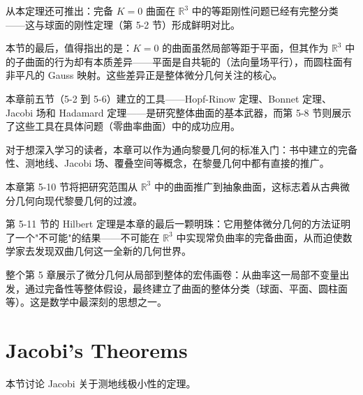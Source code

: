 \begin{Remark}
\begin{Remark}
从本定理还可推出：完备 $K=0$ 曲面在 $\mathbb{R}^3$ 中的等距刚性问题已经有完整分类——这与球面的刚性定理（第 5-2 节）形成鲜明对比。
\end{Remark}

\begin{Remark}
本节的最后，值得指出的是：$K=0$ 的曲面虽然局部等距于平面，但其作为 $\mathbb{R}^3$ 中的子曲面的行为却有本质差异——平面是自共轭的（法向量场平行），而圆柱面有非平凡的 Gauss 映射。这些差异正是整体微分几何关注的核心。
\end{Remark}

\begin{Remark}
本章前五节（5-2 到 5-6）建立的工具——Hopf-Rinow 定理、Bonnet 定理、Jacobi 场和 Hadamard 定理——是研究整体曲面的基本武器，而第 5-8 节则展示了这些工具在具体问题（零曲率曲面）中的成功应用。
\end{Remark}

\begin{Remark}
对于想深入学习的读者，本章可以作为通向黎曼几何的标准入门：书中建立的完备性、测地线、Jacobi 场、覆叠空间等概念，在黎曼几何中都有直接的推广。
\end{Remark}

\begin{Remark}
本章第 5-10 节将把研究范围从 $\mathbb{R}^3$ 中的曲面推广到抽象曲面，这标志着从古典微分几何向现代黎曼几何的过渡。
\end{Remark}

\begin{Remark}
第 5-11 节的 Hilbert 定理是本章的最后一颗明珠：它用整体微分几何的方法证明了一个"不可能"的结果——不可能在 $\mathbb{R}^3$ 中实现常负曲率的完备曲面，从而迫使数学家去发现双曲几何这一全新的几何世界。
\end{Remark}

\begin{Remark}
整个第 5 章展示了微分几何从局部到整体的宏伟画卷：从曲率这一局部不变量出发，通过完备性等整体假设，最终建立了曲面的整体分类（球面、平面、圆柱面等）。这是数学中最深刻的思想之一。
\end{Remark}

\section{Jacobi's Theorems}\label{sec:jacobi-theorems}

本节讨论 Jacobi 关于测地线极小性的定理。


\end{Remark}
